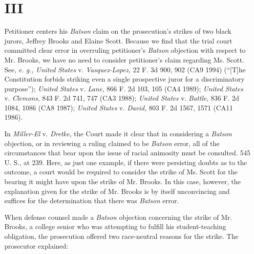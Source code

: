 \section{III}

  Petitioner centers his \emph{Batson} claim on the prosecution's strikes
of two black jurors, Jeffrey Brooks and Elaine Scott. \newpage  Because
we find that the trial court committed clear error in overruling
petitioner's \emph{Batson} objection with respect to Mr. Brooks, we have
no need to consider petitioner's claim regarding Ms. Scott. See,
\emph{e. g., United States} v. \emph{Vasquez-Lopez,} 22 F. 3d 900, 902 (CA9
1994) (``[T]he Constitution forbids striking even a single prospective
juror for a discriminatory purpose''); \emph{United States} v. \emph{Lane,}
866 F. 2d 103, 105 (CA4 1989); \emph{United States} v. \emph{Clemons,} 843 F.
2d 741, 747 (CA3 1988); \emph{United States} v. \emph{Battle,} 836 F. 2d 1084,
1086 (CA8 1987); \emph{United States} v. \emph{David,} 803 F. 2d 1567, 1571
(CA11 1986).

  In \emph{Miller-El} v. \emph{Dretke,} the Court made it clear that in
considering a \emph{Batson} objection, or in reviewing a ruling claimed to
be \emph{Batson} error, all of the circumstances that bear upon the issue
of racial animosity must be consulted. 545 U. S., at 239. Here, as just
one example, if there were persisting doubts as to the outcome, a court
would be required to consider the strike of Ms. Scott for the bearing
it might have upon the strike of Mr. Brooks. In this case, however, the
explanation given for the strike of Mr. Brooks is by itself unconvincing
and suffices for the determination that there was \emph{Batson} error.

  When defense counsel made a \emph{Batson} objection concerning the strike
of Mr. Brooks, a college senior who was attempting to fulfill his
student-teaching obligation, the prosecution offered two race-neutral
reasons for the strike. The prosecutor explained:

